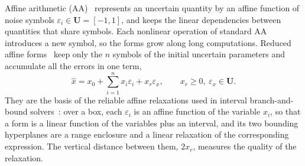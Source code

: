 \documentclass[11pt]{article}
\theoremstyle{definition}
\newcommand{\U}{\mathbf{U}}
\newcommand{\eps}{\varepsilon}
\newcommand{\ex}{\eps_x}
\begin{document}
Affine arithmetic (AA)~\cite{combastolfi1993,stolfi1997self,defigueiredo2004affine} represents an uncertain quantity by an affine function of noise symbols $\eps_i\in\U=[-1,1]$, and keeps the linear dependencies between quantities that share symbols. Each nonlinear operation of standard AA introduces a new symbol, so the forms grow along long computations. Reduced affine forms~\cite{messine2002extentions,vu2009enhancing,skalna2017new} keep only the $n$ symbols of the initial uncertain parameters and accumulate all the errors in one term,
\begin{equation}
\label{eq:raf}
\hat x = x_0 + \sum_{i=1}^n x_i\eps_i + x_r\ex,\qquad x_r\ge 0,\ \ex\in\U .
\end{equation}
They are the basis of the reliable affine relaxations used in interval branch-and-bound solvers~\cite{ninin2015reliable}: over a box, each $\eps_i$ is an affine function of the variable $x_i$, so that a form is a linear function of the variables plus an interval, and its two bounding hyperplanes are a range enclosure and a linear relaxation of the corresponding expression. The vertical distance between them, $2x_r$, measures the quality of the relaxation.
\end{document}
